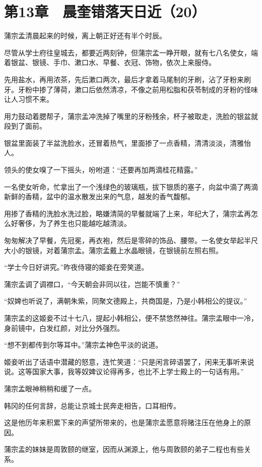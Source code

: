 \section{第13章　晨奎错落天日近（20）}

蒲宗孟清晨起来的时候，离上朝正好还有半个时辰。

尽管从学士府往皇城去，都要近两刻钟，但蒲宗孟一睁开眼，就有七八名使女，端着银盆、银镜、手巾、漱口水、早餐、衣冠、饰物，依次上来服侍。

先用盐水，再用浓茶，先后漱口两次，最后才拿着马尾制的牙刷，沾了牙粉来刷牙。牙粉中掺了薄荷，漱口后依然清凉，不像之前用松脂和茯苓制成的牙粉的怪味让人习惯不来。

用力鼓动着腮帮子，蒲宗孟冲洗掉了嘴里的牙粉残余，杯子被取走，洗脸的银盆就段到了面前。

银盆里面装了半盆洗脸水，还冒着热气，里面掺了一点香精，清清淡淡，清雅怡人。

领头的使女嗅了一下摇头，吩咐道：“还要再加两滴桂花精露。”

一名使女听命，忙拿出了一个浅绿色的玻璃瓶，拔下银质的塞子，向盆中滴了两滴新鲜的香精，盆中的温水散发出来的气息，越发的香气馥郁。

用掺了香精的洗脸水洗过脸，略嫌清简的早餐就端了上来，年纪大了，蒲宗孟再怎么好奢侈，为了养生也只能越吃越清淡。

匆匆解决了早餐，先冠冕，再衣袍，然后是零碎的饰品、腰带。一名使女举起半尺大小的银镜，对着蒲宗孟。蒲宗孟戴上水晶眼镜，在银镜前左照右照。

“学士今日好讲究。”昨夜侍寝的姬妾在旁笑道。

蒲宗孟调了调襟口，“今天朝会非同以往，岂能不慎重？”

“奴婢也听说了，满朝朱紫，同聚文德殿上，共商国是，乃是小韩相公的提议。”

蒲宗孟的这姬妾不过十七八，提起小韩相公，便不禁悠然神往。蒲宗孟眼中一冷，身前镜中，白发红颜，对比分外强烈。

“想不到都传到尔等耳中。”蒲宗孟神色平淡的说道。

姬妾听出了话语中潜藏的怒意，连忙笑道：“只是闲言碎语罢了，闲来无事听来说说。这等国家大事，我等奴婢议论得再多，也比不上学士殿上的一句话有用。”

蒲宗孟眼神稍稍和缓了一点。

韩冈的任何言辞，总能让京城士民奔走相告，口耳相传。

这是他历年来积累下来的声望所带来的，也是蒲宗孟愿意将赌注压在他身上的原因。

蒲宗孟的妹妹是周敦颐的继室，因而从渊源上，他与周敦颐的弟子二程也有些关系。

